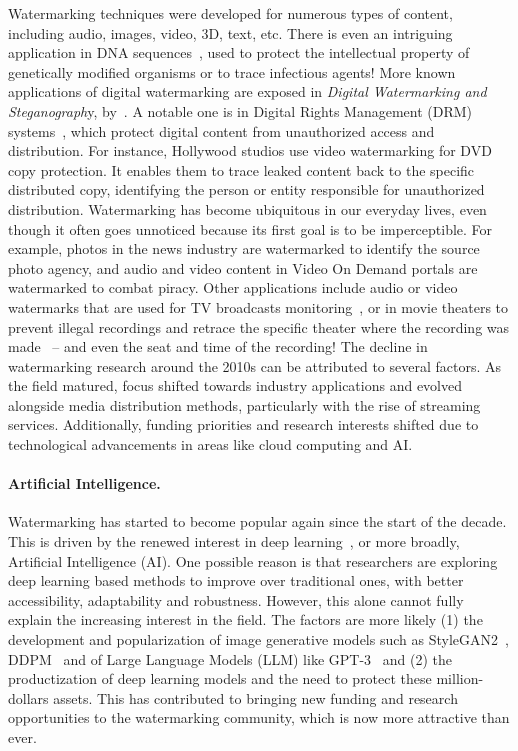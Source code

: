 Watermarking techniques were developed for numerous types of content, including audio, images, video, 3D, text, etc.
There is even an intriguing application in DNA sequences~\citep{shimanovsky2002hiding, heider2007dna}, used to protect the intellectual property of genetically modified organisms or to trace infectious agents!
More known applications of digital watermarking are exposed in \textit{Digital Watermarking and Steganograph}y, by~\cite{cox2007digital}.
A notable one is in Digital Rights Management (DRM) systems~\citep{barni2004data}, which protect digital content from unauthorized access and distribution. 
For instance, Hollywood studios use video watermarking for DVD copy protection.
It enables them to trace leaked content back to the specific distributed copy, identifying the person or entity responsible for unauthorized distribution.
Watermarking has become ubiquitous in our everyday lives, even though it often goes unnoticed because its first goal is to be imperceptible.
For example, photos in the news industry are watermarked to identify the source photo agency, and audio and video content in Video On Demand portals are watermarked to combat piracy. 
Other applications include audio or video watermarks that are used for TV broadcasts monitoring~\citep{depovere1999viva}, or in movie theaters to prevent illegal recordings and retrace the specific theater where the recording was made~\citep{nakashima2009watermarked} -- and even the seat and time of the recording!
The decline in watermarking research around the 2010s can be attributed to several factors. 
As the field matured, focus shifted towards industry applications and evolved alongside media distribution methods, particularly with the rise of streaming services. 
Additionally, funding priorities and research interests shifted due to technological advancements in areas like cloud computing and AI.

\paragraph*{Artificial Intelligence.}

Watermarking has started to become popular again since the start of the decade.
This is driven by the renewed interest in deep learning~\citep{lecun2015deep}, or more broadly, Artificial Intelligence (AI).
One possible reason is that researchers are exploring deep learning based methods to improve over traditional ones, with better accessibility, adaptability and robustness. 
However, this alone cannot fully explain the increasing interest in the field.
The factors are more likely (1) the development and popularization of image generative models such as StyleGAN2~\citep{karras2020analyzing}, DDPM~\citep{ho2020denoising} and of Large Language Models (LLM) like GPT-3~\citep{brown2020language} and (2) the productization of deep learning models and the need to protect these million-dollars assets.
This has contributed to bringing new funding and research opportunities to the watermarking community, which is now more attractive than ever.

